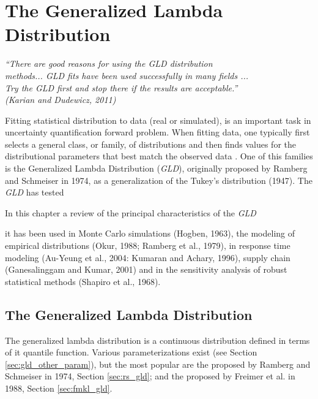 \chapter[The Generalized Lambda Distribution]{The Generalized Lambda Distribution}\label{cap:gld}

\begin{flushright}
	\textit{``There are good reasons for using the GLD distribution \\
	methods... GLD fits have been used successfully in many fields ...\\
	Try the GLD first and stop there if the results are acceptable.''\\
	(Karian and Dudewicz, 2011)}
\end{flushright}


Fitting statistical distribution to data (real or simulated), is an important task in uncertainty quantification forward problem. When fitting data, one typically first selects a general class, or family, of distributions and then finds values for the distributional parameters that best match the observed data \cite{Lakhany2000}. One of this families is the Generalized Lambda Distribution (\textit{GLD}), originally proposed by Ramberg and Schmeiser in 1974, as a generalization of the Tukey's distribution (1947). The \textit{GLD} has tested 

In this chapter a review of the principal characteristics of the \textit{GLD}

it has been used in Monte Carlo simulations (Hogben, 1963), the modeling of empirical distributions (Okur, 1988; Ramberg et al., 1979), in response time modeling (Au-Yeung et al., 2004: Kumaran and Achary, 1996), supply chain (Ganesalinggam and Kumar, 2001) and in the sensitivity analysis of robust statistical methods (Shapiro et al., 1968).

\section{The Generalized Lambda Distribution}

The generalized lambda distribution is a continuous distribution defined in terms of it quantile function. Various parameterizations exist (see Section \ref{sec:gld_other_param}), but the most popular are the proposed by Ramberg and Schmeiser in 1974, Section \ref{sec:rs_gld}; and the proposed by Freimer et al. in 1988, Section \ref{sec:fmkl_gld}.

